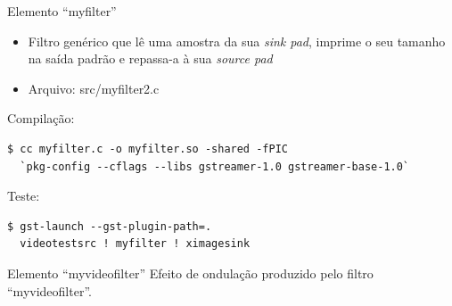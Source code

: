 \documentclass{beamer}
\def\en#1{\foreignlanguage{english}{\emph{#1}}}
\begin{document}
\begin{frame}[fragile]{Elemento ``myfilter''}
  \begin{itemize}
    \item Filtro genérico que lê uma amostra da sua \en{sink pad}, imprime 
      o seu tamanho na saída padrão e repassa-a à sua \en{source pad}
    \item Arquivo: src/myfilter2.c
  \end{itemize}

  Compilação:
  \begin{lstlisting}[style=command, breaklines=true]
$ cc myfilter.c -o myfilter.so -shared -fPIC
  `pkg-config --cflags --libs gstreamer-1.0 gstreamer-base-1.0`
  \end{lstlisting}

  Teste:
  \begin{lstlisting}[style=command, breaklines=true]
$ gst-launch --gst-plugin-path=.
  videotestsrc ! myfilter ! ximagesink
  \end{lstlisting}
\end{frame}

\begin{frame}[c]{Elemento ``myvideofilter''}
  Efeito de ondulação produzido pelo filtro ``myvideofilter''.
  \begin{figure}[H]
    \centering
  \end{figure}
\end{frame}
\end{document}
